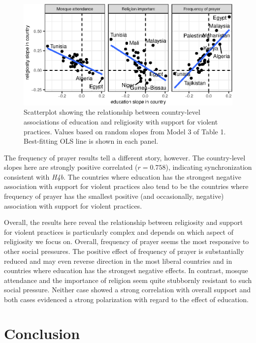 \documentclass[10pt,letterpaper]{article}
\begin{document}
\begin{figure}[!h]
\centering
\includegraphics{figures/fig5.eps}
\caption{Scatterplot showing the relationship between country-level associations of education and religiosity with support for violent practices. Values based on random slopes from Model 3 of Table 1. Best-fitting OLS line is shown in each panel.}
\label{fig:slope-compare-plot}
\end{figure}

The frequency of prayer results tell a different story, however. The country-level slopes here are strongly positive correlated (\(r=0.758\)), indicating synchronization consistent with \emph{H4b}. The countries where education has the strongest negative association with support for violent practices also tend to be the countries where frequency of prayer has the smallest positive (and occasionally, negative) association with support for violent practices.

Overall, the results here reveal the relationship between religiosity and support for violent practices is particularly complex and depends on which aspect of religiosity we focus on. Overall, frequency of prayer seems the most responsive to other social pressures. The positive effect of frequency of prayer is substantially reduced and may even reverse direction in the most liberal countries and in countries where education has the strongest negative effects. In contrast, mosque attendance and the importance of religion seem quite stubbornly resistant to such social pressure. Neither case showed a strong correlation with overall support and both cases evidenced a strong polarization with regard to the effect of education.

\section*{Conclusion}
\end{document}

